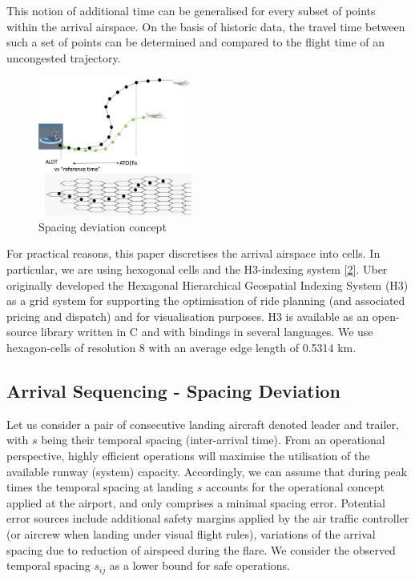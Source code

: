 \documentclass[letterpaper, 10 pt, journal, twoside]{IEEEtran}
\begin{document}
This notion of additional time can be generalised for every subset of
points within the arrival airspace. On the basis of historic data, the
travel time between such a set of points can be determined and compared
to the flight time of an uncongested trajectory.

\begin{figure}

{\centering \includegraphics[width=0.45\textwidth,height=\textheight]{./figures/concept.png}

}

\caption{\label{fig-spacing-deviation-concept}Spacing deviation concept}

\end{figure}

For practical reasons, this paper discretises the arrival airspace into
cells. In particular, we are using hexogonal cells and the H3-indexing
system \protect\hyperlink{ref-ubertechnologiesinc2018}{{[}2{]}}. Uber
originally developed the Hexagonal Hierarchical Geospatial Indexing
System (H3) as a grid system for supporting the optimisation of ride
planning (and associated pricing and dispatch) and for visualisation
purposes. H3 is available as an open-source library written in C and
with bindings in several languages. We use hexagon-cells of resolution 8
with an average edge length of 0.5314 km.

\hypertarget{arrival-sequencing---spacing-deviation}{%
\subsection{Arrival Sequencing - Spacing
Deviation}\label{arrival-sequencing---spacing-deviation}}

Let us consider a pair of consecutive landing aircraft denoted leader
and trailer, with \(s\) being their temporal spacing (inter-arrival
time). From an operational perspective, highly efficient operations will
maximise the utilisation of the available runway (system) capacity.
Accordingly, we can assume that during peak times the temporal spacing
at landing \(s\) accounts for the operational concept applied at the
airport, and only comprises a minimal spacing error. Potential error
sources include additional safety margins applied by the air traffic
controller (or aircrew when landing under visual flight rules),
variations of the arrival spacing due to reduction of airspeed during
the flare. We consider the observed temporal spacing \(s_{ij}\) as a
lower bound for safe operations.
\end{document}
